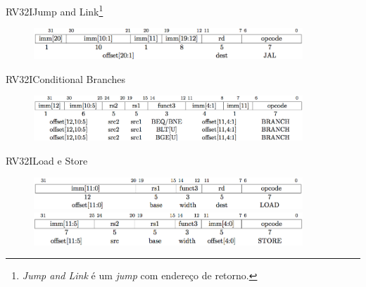 \documentclass[aspectratio=169, xcolor=dvipsnames]{beamer}
\begin{document}
\begin{frame}{RV32I}{Jump and Link\footnote{\textit{Jump and Link} é um \textit{jump} com endereço de retorno.}}
	\begin{figure}
		\centering
		\label{fig:}
		\includegraphics[width=0.9\textwidth]{img/jal.png}
	\end{figure}
\end{frame}

\begin{frame}{RV32I}{Conditional Branches}
	\begin{figure}
		\centering
		\label{fig:}
		\includegraphics[width=0.9\textwidth]{img/conditional-branch.png}
	\end{figure}
\end{frame}

\begin{frame}{RV32I}{Load e Store}
	\begin{figure}
		\centering
		\label{fig:}
		\includegraphics[width=0.9\textwidth]{img/load.png}\\[1cm]
		\includegraphics[width=0.9\textwidth]{img/store.png}
	\end{figure}
\end{frame}
\end{document}
